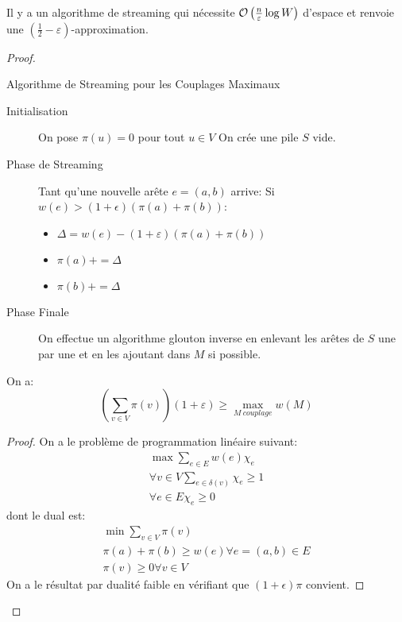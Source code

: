 \documentclass[math, info]{cours}
\begin{document}
\begin{thm}
	Il y a un algorithme de streaming qui nécessite $\mathcal{O}\left(\frac{n}{\varepsilon}\log W \right)$ d'espace et renvoie une $\left(\frac{1}{2}-\varepsilon \right)$-approximation.
\end{thm}
\begin{proof}
	\begin{algorithm}
		\caption{Algorithme de Streaming pour les Couplages Maximaux}
		\begin{description}
			\item[Initialisation] On pose $\pi(u) = 0$ pour tout $u \in V$
			      On crée une pile $S$ vide.
			\item[Phase de Streaming]
			      Tant qu'une nouvelle arête $e =(a, b)$ arrive:
			      Si $w(e) > (1 + \epsilon)(\pi(a) + \pi(b))$:
			      \begin{itemize}
				      \item $\Delta = w(e) - (1 + \varepsilon)(\pi(a) + \pi(b))$
				      \item $\pi(a) += \Delta$
				      \item $\pi(b) += \Delta$
			      \end{itemize}
			\item[Phase Finale] On effectue un algorithme glouton inverse en enlevant les arêtes de $S$ une par une et en les ajoutant dans $M$ si possible.
		\end{description}
		\label{alg:streamingmatching}
	\end{algorithm}

	\begin{lemme}
		On a:
		\begin{equation*}
			\left(\sum_{v \in V} \pi(v) \right)\left(1 + \varepsilon \right) \geq \max_{M \ couplage} w(M)
		\end{equation*}
		\label{lemma:streammatching1}
	\end{lemme}
	\begin{proof}
		On a le problème de programmation linéaire suivant:
		\begin{align*}
			\max \sum_{e \in E} w(e)\chi_{e}                       \\
			\forall v \in V \sum_{e \in \delta(v)} \chi_{e} \geq 1 \\
			\forall e \in E \chi_{e} \geq 0
		\end{align*}
		dont le dual est:
		\begin{align*}
			\min \sum_{v \in V}\pi(v)                        \\
			\pi(a) + \pi(b) \geq w(e) \forall e=(a, b) \in E \\
			\pi(v) \geq 0 \forall v \in V
		\end{align*}
		On a le résultat par dualité faible en vérifiant que $(1 + \epsilon)\pi$ convient.
	\end{proof}


\end{proof}
\end{document}
